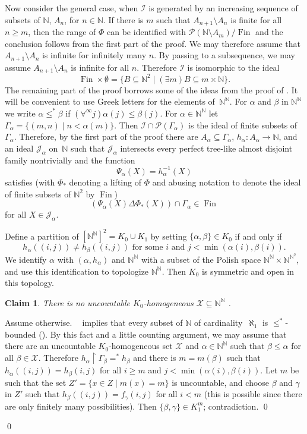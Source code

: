 \documentclass{amsart}
\makeatletter
\def\Fin{{\rm Fin}}   %
\def\FinO{\Fin\times\emptyset}
\def\rs{\restriction}
\def\text{\mbox}
\newtheorem{claim}{Claim}
\theoremstyle{definition}
\theoremstyle{remark}
\def\Fin{\operatorname{Fin}}
\def\FinO{\Fin\times\emptyset}
\renewcommand{\proofname}{Proof}
\renewenvironment{proof}[1][\proofname]{\par
\let\oldqedsymbol\qedsymbol             %
  \normalfont
  \topsep6\p@\@plus6\p@ \trivlist
  \item[\hskip\labelsep\hskip\parindent\scshape
    #1\@addpunct{.}]\ignorespaces
}{%
  \qed\endtrivlist
\global\let\qedsymbol\oldqedsymbol      %
}
\newcommand{\cP}{\mathcal P}
\newcommand{\bbN}{\mathbb N}
\newcommand{\cI}{{\mathcal I}} %
\newcommand{\cJ}{{\mathcal J}} %
\newcommand{\cX}{\mathcal X}
\DeclareMathOperator{\OCAT}{OCA_T}
\newcommand{\bbNN}{\bbN^\bbN}
\numberwithin{claim}{subsection}
\makeatother
\begin{document}
\begin{proof}[Proof of Theorem~\ref{T.OCAsharp-Fin}]
	
	Now consider the general case, when $\cI$ is generated by an increasing sequence of subsets of $\bbN$, $A_n$, for $n\in \bbN$. If there is $m$ such that $A_{n+1}\setminus A_n$ is finite for all $n\geq m$, then the range of  $\Phi$ can be identified with $\cP(\bbN\setminus A_m)/\Fin$ and the conclusion follows from the first part of the proof. 
	We may therefore assume that $A_{n+1}\setminus A_n$ is infinite for infinitely many $n$. By passing to a subsequence, we may assume $A_{n+1}\setminus A_n$ is infinite for all $n$. Therefore $\cI$ is isomorphic to the ideal 
	\[
	\FinO=\{B\subseteq \bbN^2\mid(\exists m) B\subseteq m\times \bbN\}.
	\]
	The remaining part of the proof borrows some of the ideas from the proof of \cite[Theorem~1.9.2]{Fa:AQ}.  It will be convenient to use Greek letters for the elements of~$\bbNN$. For $\alpha$ and $\beta$ in $\bbNN$ we write $\alpha\leq^* \beta$ if $(\forall^\infty j)\alpha(j)\leq \beta(j)$. 
	For $\alpha\in \bbNN$ let $\Gamma_\alpha=\{(m,n)\mid n<\alpha(m)\}$. Then $\cI\cap \cP(\Gamma_\alpha)$ is the ideal of finite subsets of $\Gamma_\alpha$.  Therefore, by the first part of the proof there are $A_\alpha\subseteq \Gamma_\alpha$, $h_\alpha\colon A_\alpha\to \bbN$,  and an ideal $\cJ_\alpha$ on~$\bbN$ such  that $\cJ_\alpha$ intersects every perfect tree-like almost disjoint family nontrivially and the function
	\[
	\Psi_\alpha(X)= h_\alpha^{-1}(X)
	\]
	satisfies (with $\Phi_*$ denoting a lifting of $\Phi$ and abusing notation to denote the ideal of finite subsets of $\bbN^2$ by $\Fin$)  
	\[
	(\Psi_\alpha(X)\Delta \Phi_*(X))\cap \Gamma_\alpha\in \Fin
	\]
	for all $X\in \cJ_\alpha$.  
	
	
	Define a partition of $[\bbNN]^2=K_0\cup K_1$ by 	setting $\{\alpha,\beta\}\in  K_0$ if and only if 
	\[
h_\alpha((i,j))\neq h_\beta((i,j))\text{ for some $i$ and $j<\min(\alpha(i),\beta(i))$}. 
	\]
	We identify $\alpha$ with $(\alpha,h_\alpha)$  and $\bbNN$ with a subset of the Polish space $\bbNN\times \bbN^{\bbN^2}$, and use this identification to topologize $\bbNN$.  Then $K_0$ is symmetric and open in this topology. 
		
	
	\begin{claim} \label{C.FinO} There is no uncountable $K_0$-homogeneous $\cX\subseteq \bbNN$ . 
	\end{claim} 
\begin{proof}
	Assume otherwise.  $\OCAT$ implies that every subset of $\bbN$ of cardinality~$\aleph_1$ is $\leq^*$-bounded (\cite{To:Partition}).  By this fact and a little counting argument,  we may assume that there are an uncountable $K_0$-homogeneous set $\cX$ and $\alpha\in \bbNN$ such that $\beta\leq\alpha$ for all $\beta\in \cX$. 
	Therefore $h_\alpha\rs \Gamma_{\beta}=^*h_{\beta}$ and there is $m=m(\beta)$ such that $h_\alpha((i,j))=h_{\beta}(i,j)$ for all $i\geq m$ and $j<\min(\alpha(i), \beta(i))$. 
	Let $m$ be such that the set $Z'=\{x\in Z\mid m(x)=m\}$ is uncountable, and choose $\beta$ and $\gamma$ in $Z'$ such that $h_{\beta}((i,j))=f_{\gamma}(i,j)$ for all $i<m$ (this is possible since there are only finitely many possibilities). Then $\{\beta,\gamma\}\in K_1^m$; contradiction. 
\end{proof}	
	

\end{proof}
\end{document}
